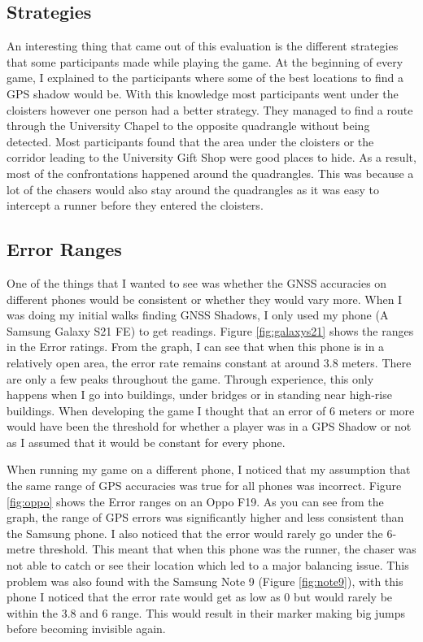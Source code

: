 \documentclass{l4proj}
\begin{document}
\subsection{Strategies}
An interesting thing that came out of this evaluation is the different strategies that some participants made while playing the game. At the beginning
of every game, I explained to the participants where some of the best locations to find a GPS shadow would be. With this knowledge most participants
went under the cloisters however one person had a better strategy. They managed to find a route through the University Chapel to the opposite
quadrangle without being detected. Most participants found that the area under the cloisters or the corridor leading to the University Gift Shop were good places to hide. As a result, most of
the confrontations happened around the quadrangles. This was because a lot of the chasers would also stay around the quadrangles as it was easy to intercept
a runner before they entered the cloisters.

\subsection{Error Ranges}
\label{phase1errorrange}
One of the things that I wanted to see was whether the GNSS accuracies on different phones would be consistent or whether they would vary more.
When I was doing my initial walks finding GNSS Shadows, I only used my phone (A Samsung Galaxy S21 FE) to get readings. Figure \ref{fig:galaxys21}
shows the ranges in the Error ratings. From the graph, I can see that when this phone is in a relatively open area, the error rate remains constant at around 3.8 meters. There
are only a few peaks throughout the game. Through experience, this only happens when I go into buildings, under bridges or in standing near high-rise buildings. 
When developing the game I thought that an error of 6 meters or more would have been the threshold for whether a player was in a GPS Shadow or not as I
assumed that it would be constant for every phone.

When running my game on a different phone, I noticed that my assumption that the same range of GPS accuracies was true for all phones was incorrect. Figure \ref{fig:oppo}
shows the Error ranges on an Oppo F19. As you can see from the graph, the range of GPS errors was significantly higher and less consistent than the Samsung phone. I also
noticed that the error would rarely go under the 6-metre threshold. This meant that when this phone was the runner, the chaser was not able to catch or see their location
which led to a major balancing issue. This problem was also found with the Samsung Note 9 (Figure \ref{fig:note9}), with this phone I noticed that the error rate would get
as low as 0 but would rarely be within the 3.8 and 6 range. This would result in their marker making big jumps before becoming invisible again.
\end{document}
